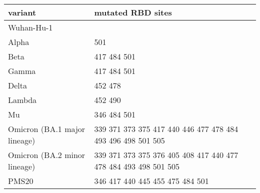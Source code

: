 \begin{tabular}{ll}
\toprule
                     variant &                                               mutated RBD sites \\
\midrule
                  Wuhan-Hu-1 &                                                                 \\
                       Alpha &                                                             501 \\
                        Beta &                                                     417 484 501 \\
                       Gamma &                                                     417 484 501 \\
                       Delta &                                                         452 478 \\
                      Lambda &                                                         452 490 \\
                          Mu &                                                     346 484 501 \\
Omicron (BA.1 major lineage) &     339 371 373 375 417 440 446 477 478 484 493 496 498 501 505 \\
Omicron (BA.2 minor lineage) & 339 371 373 375 376 405 408 417 440 477 478 484 493 498 501 505 \\
                       PMS20 &                                 346 417 440 445 455 475 484 501 \\
\bottomrule
\end{tabular}
